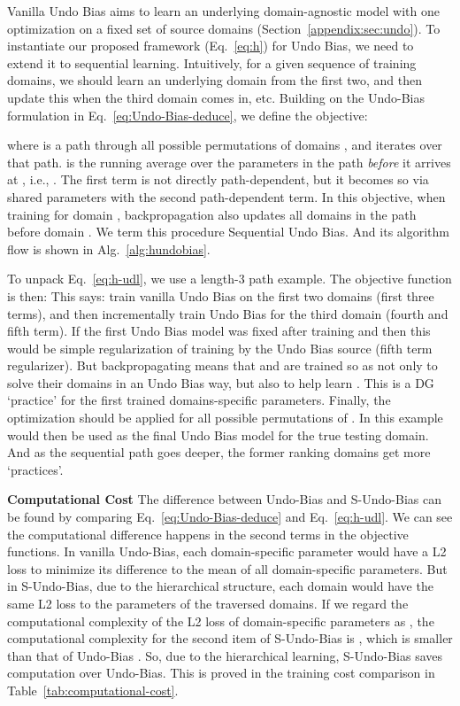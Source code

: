\documentclass[runningheads]{llncs}
\newcommand{\hundo}{S-Undo-Bias}
\newcommand{\keypoint}[1]{\vspace{0.1cm}\noindent\textbf{#1}\quad}
\begin{document}
Vanilla Undo Bias aims to learn an underlying domain-agnostic model with one optimization on a fixed set of source domains (Section~\ref{appendix:sec:undo}). To instantiate our proposed framework (Eq.~\ref{eq:h}) for Undo Bias, we need to extend it to sequential learning. Intuitively, for a given sequence of training domains, we should learn an underlying domain from the first two, and then update this when the third domain comes in, etc. Building on the Undo-Bias formulation in Eq.~\ref{eq:Undo-Bias-deduce}, we define the objective: 
\small

\normalsize

\noindent where  is a path through all possible permutations of domains , and  iterates over that path.  is the running average over the parameters in the path \emph{before} it arrives at , i.e., . The first term is not directly path-dependent, but it becomes so via shared parameters with the second path-dependent term. In this objective, when training  for domain , backpropagation also updates all domains in the path before domain . We term this procedure Sequential Undo Bias. And its algorithm flow is shown in Alg.~\ref{alg:hundobias}.

To unpack Eq.~\ref{eq:h-udl}, we use a length-3 path example. The objective function is then:
\small
\normalsize
This says: train vanilla Undo Bias on the first two domains (first three terms), and then incrementally train Undo Bias for the third domain (fourth and fifth term). If the first Undo Bias model  was fixed after training  and  then this would be simple regularization of  training by the Undo Bias source (fifth term regularizer). But backpropagating means that  and  are trained so as not only to solve their domains in an Undo Bias way, but also to help learn . This is a DG `practice' for the first trained domains-specific parameters. Finally, the optimization should be applied for all possible permutations of . In this example  would then be used as the final Undo Bias model for the true testing domain. And as the sequential path goes deeper, the former ranking domains get more `practices'.


\keypoint{Computational Cost}
The difference between Undo-Bias and \hundo{} can be found by comparing Eq.~\ref{eq:Undo-Bias-deduce} and Eq.~\ref{eq:h-udl}. We can see the computational difference happens in the second terms in the objective functions. In vanilla Undo-Bias, each domain-specific parameter would have a L2 loss to minimize its difference to the mean of all domain-specific parameters. But in \hundo, due to the hierarchical structure, each domain would have the same L2 loss to the parameters of the traversed domains. If we regard the computational complexity of the L2 loss of  domain-specific parameters as , the computational complexity for the second item of \hundo{} is , which is smaller than that of Undo-Bias . So, due to the hierarchical learning, \hundo{} saves computation over Undo-Bias. This is proved in the training cost comparison in Table~\ref{tab:computational-cost}.
\end{document}
